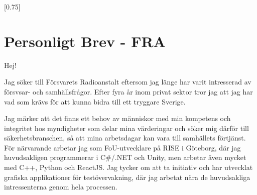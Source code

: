 \documentclass[lighthipster]{simplehipstercv}
\begin{document}
\setlength{\columnsep}{1.5cm}
[0.75]
\begin{paracol}{2}

\paracolbackgroundoptions



\footnotesize
{\setasidefontcolour
\flushright
\begin{center}
\end{center}

\bigskip

\flushleft
{}

\phantom{turn the page}

\phantom{turn the page}
}
\switchcolumn

\begin{minipage}[t]{0.71\textwidth}
\section*{Personligt Brev - FRA}
Hej!

Jag söker till Försvarets Radioanstalt eftersom jag länge har varit intresserad av försvsar- och samhällsfrågor. Efter fyra år inom privat sektor tror jag att jag har vad som krävs för att kunna bidra till ett tryggare Sverige.

Jag märker att det finns ett behov av människor med min kompetens och integritet hos myndigheter som delar mina värderingar och söker mig därför till säkerhetsbranschen, så att mina arbetsdagar kan vara till samhällets förtjänst.\\

För närvarande arbetar jag som FoU-utvecklare på RISE i Göteborg, där jag huvudsakligen programmerar i C\#/.NET och Unity, men arbetar även mycket med C++, Python och ReactJS. Jag tycker om att ta initiativ och har utvecklat grafiska applikationer för testövervakning, där jag arbetat nära de huvudsakliga intressenterna genom hela processen.


\end{minipage}
\end{paracol}
\end{document}
